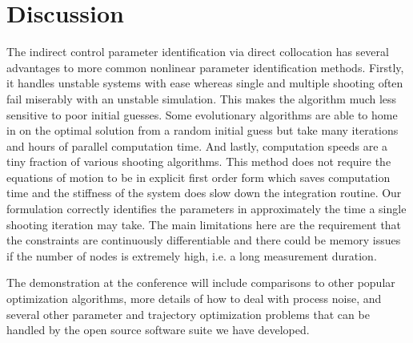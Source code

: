 \documentclass[11pt,a4paper,twocolumn]{article}
\begin{document}
\section*{Discussion}

The indirect control parameter identification via direct collocation has
several advantages to more common nonlinear parameter identification methods.
Firstly, it handles unstable systems with ease whereas single and multiple
shooting often fail miserably with an unstable simulation. This makes the
algorithm much less sensitive to poor initial guesses. Some evolutionary
algorithms are able to home in on the optimal solution from a random initial
guess but take many iterations and hours of parallel computation time.  And
lastly, computation speeds are a tiny fraction of various shooting algorithms.
This method does not require the equations of motion to be in explicit first
order form which saves computation time and the stiffness of the system does
slow down the integration routine. Our formulation correctly identifies the
parameters in approximately the time a single shooting iteration may take. The
main limitations here are the requirement that the constraints are continuously
differentiable and there could be memory issues if the number of nodes is
extremely high, i.e. a long measurement duration.

The demonstration at the conference will include comparisons to other popular
optimization algorithms, more details of how to deal with process noise, and
several other parameter and trajectory optimization problems that can be
handled by the open source software suite we have developed.



\end{document}
